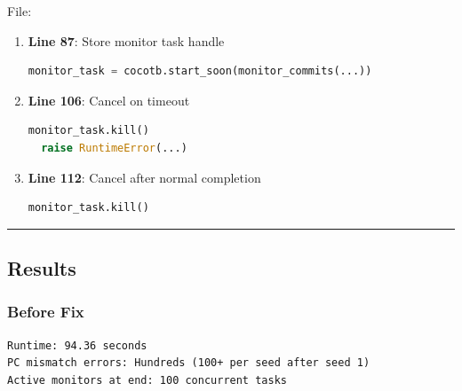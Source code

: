 \begin{record}

File: 

\begin{enumerate}
\def\labelenumi{\arabic{enumi}.}
\item
  \textbf{Line 87}: Store monitor task handle

  \begin{lstlisting}[language=Python]
  monitor_task = cocotb.start_soon(monitor_commits(...))
  \end{lstlisting}
\item
  \textbf{Line 106}: Cancel on timeout

  \begin{lstlisting}[language=Python]
  monitor_task.kill()
  raise RuntimeError(...)
  \end{lstlisting}
\item
  \textbf{Line 112}: Cancel after normal completion

  \begin{lstlisting}[language=Python]
  monitor_task.kill()
  \end{lstlisting}
\end{enumerate}

\begin{center}\rule{0.5\linewidth}{0.5pt}\end{center}

\end{record}

\subsection{Results}\label{cr:fix:pc-mismatch-fix:results}

\subsubsection{Before Fix}\label{cr:fix:pc-mismatch-fix:before-fix}

\begin{record}

\begin{lstlisting}[language={}]
Runtime: 94.36 seconds
PC mismatch errors: Hundreds (100+ per seed after seed 1)
Active monitors at end: 100 concurrent tasks
\end{lstlisting}

\end{record}

